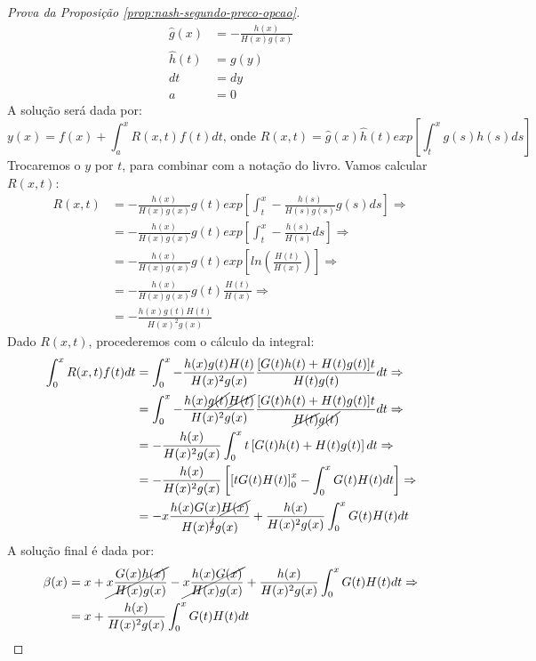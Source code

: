 \begin{proof}[Prova da Proposição \ref{prop:nash-segundo-preco-opcao}]
\begin{align*}
		\widehat{g}(x) & = -\frac{h(x)}{H(x)g(x)} \\
		\widehat{h}(t) & = g(y) \\
		dt &= dy \\
		a &= 0
	\end{align*}
	A solução será dada por:
	\begin{equation*}
		y(x) = f(x) + \int_a^x R(x,t)f(t)dt \text{, onde } R(x,t) = \widehat{g}(x)\widehat{h}(t)exp\left[ \int_t^x g(s)h(s)ds \right]
	\end{equation*}
	Trocaremos o $y$ por $t$, para combinar com a notação do livro. Vamos calcular $R(x,t)$:
	\begin{align*}
		R(x,t) & = -\frac{h(x)}{H(x)g(x)} g(t) exp\left[ \int_t^x -\frac{h(s)}{H(s)g(s)}g(s)ds \right] \Rightarrow \\
		& = -\frac{h(x)}{H(x)g(x)} g(t) exp\left[ \int_t^x -\frac{h(s)}{H(s)}ds \right] \Rightarrow \\
		& = -\frac{h(x)}{H(x)g(x)} g(t) exp\left[ ln \left( \frac{H(t)}{H(x)} \right) \right] \Rightarrow \\
		& = -\frac{h(x)}{H(x)g(x)} g(t) \frac{H(t)}{H(x)} \Rightarrow \\
		& = -\frac{h(x)g(t)H(t)}{H(x)^2g(x)}
	\end{align*}
	Dado $R(x,t)$, procederemos com o cálculo da integral:
	\begin{align*}
		\int_0^x R(x,t)f(t)dt & = \int_0^x -\frac{h(x)g(t)H(t)}{H(x)^2g(x)} \frac{[G(t)h(t)+H(t)g(t)]t}{H(t)g(t)} dt \Rightarrow \\
		& = \int_0^x -\frac{h(x)\cancel{g(t)}\cancel{H(t)}}{H(x)^2g(x)} \frac{[G(t)h(t)+H(t)g(t)]t}{\cancel{H(t)}\cancel{g(t)}} dt \Rightarrow \\
		& = -\frac{h(x)}{H(x)^2g(x)} \int_0^x  t \left[ G(t)h(t)+H(t)g(t) \right] dt \Rightarrow \\
		& = -\frac{h(x)}{H(x)^2g(x)} \left[ \left[ tG(t)H(t) \right]_0^x -\int_0^x G(t)H(t)dt \right] \Rightarrow \\
		& = -x \frac{h(x)G(x)\cancel{H(x)}}{H(x)^{\cancel{2}}g(x)} + \frac{h(x)}{H(x)^2g(x)}\int_0^x G(t)H(t)dt
	\end{align*}
	A solução final é dada por:
	\begin{align*}
		\beta(x) & = x + \cancel{x \frac{G(x)h(x)}{H(x)g(x)}} - \cancel{x \frac{h(x)G(x)}{H(x)g(x)}} + \frac{h(x)}{H(x)^2g(x)}\int_0^x G(t)H(t)dt \Rightarrow \\
		& = x + \frac{h(x)}{H(x)^2g(x)}\int_0^x G(t)H(t)dt
	\end{align*}
\end{proof}

